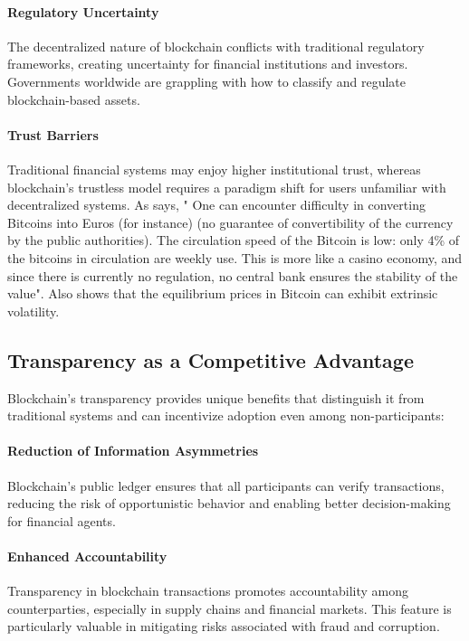 \paragraph{Regulatory Uncertainty}
The decentralized nature of blockchain conflicts with traditional regulatory frameworks, creating uncertainty for financial institutions and investors. Governments worldwide are grappling with how to classify and regulate blockchain-based assets.

\paragraph{Trust Barriers}
Traditional financial systems may enjoy higher institutional trust, whereas blockchain's trustless model requires a paradigm shift for users unfamiliar with decentralized systems. As  says, " One can encounter difficulty in converting
Bitcoins into Euros (for instance) (no guarantee of convertibility of the currency by the public
authorities). The circulation speed of the Bitcoin is low: only 4\% of the bitcoins in circulation are weekly use. This is more like a casino economy, and since there is currently no regulation, no
central bank ensures the stability of the value". Also  shows that the equilibrium prices in Bitcoin can exhibit extrinsic volatility.

\subsection{Transparency as a Competitive Advantage}

Blockchain's transparency provides unique benefits that distinguish it from traditional systems and can incentivize adoption even among non-participants:

\paragraph{Reduction of Information Asymmetries}
Blockchain's public ledger ensures that all participants can verify transactions, reducing the risk of opportunistic behavior and enabling better decision-making for financial agents. 

\paragraph{Enhanced Accountability}
Transparency in blockchain transactions promotes accountability among counterparties, especially in supply chains and financial markets. This feature is particularly valuable in mitigating risks associated with fraud and corruption.

